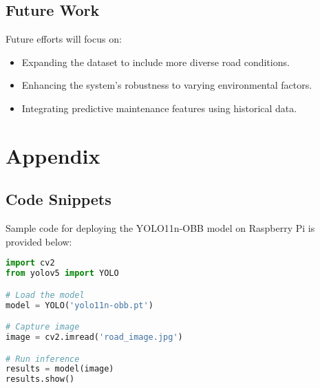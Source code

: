 \documentclass[12pt,a4paper]{report}
\begin{document}
\section{Future Work}
Future efforts will focus on:
\begin{itemize}
    \item Expanding the dataset to include more diverse road conditions.
    \item Enhancing the system's robustness to varying environmental factors.
    \item Integrating predictive maintenance features using historical data.
\end{itemize}

\appendix
\chapter{Appendix}
\section{Code Snippets}
Sample code for deploying the YOLO11n-OBB model on Raspberry Pi is provided below:
\begin{lstlisting}[language=Python, caption=Training code]
import cv2
from yolov5 import YOLO

# Load the model
model = YOLO('yolo11n-obb.pt')

# Capture image
image = cv2.imread('road_image.jpg')

# Run inference
results = model(image)
results.show()
\end{lstlisting}



\end{document}
